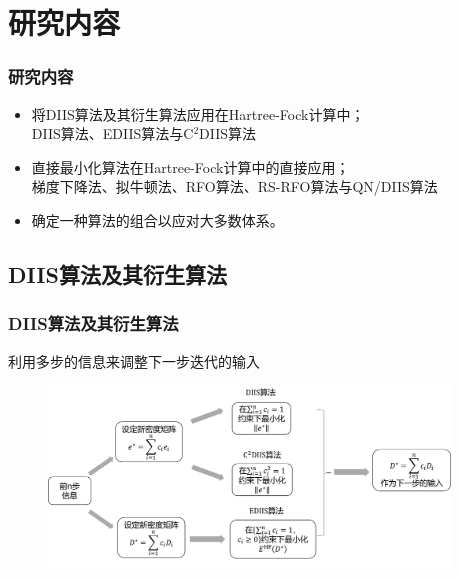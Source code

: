 \documentclass[10pt,aspectratio=43,mathserif,UTF8]{beamer}
\begin{document}
\section{研究内容}
\begin{frame}
\frametitle{研究内容}
	\begin{itemize}
		\item 将DIIS算法及其衍生算法应用在Hartree-Fock计算中；\\
		DIIS算法、EDIIS算法与C$^2$DIIS算法
		\item 直接最小化算法在Hartree-Fock计算中的直接应用；\\
		梯度下降法、拟牛顿法、RFO算法、RS-RFO算法与QN/DIIS算法
		\item 确定一种算法的组合以应对大多数体系。
	\end{itemize}

\end{frame}


\subsection{DIIS算法及其衍生算法}
\begin{frame}
	\frametitle{DIIS算法及其衍生算法}
	利用多步的信息来调整下一步迭代的输入
	
	\begin{figure}[htbp]
		\centering
		\includegraphics[width=0.95\textwidth]{figure/HF/DIIS2.png}
	\end{figure}

\end{frame}
\end{document}
